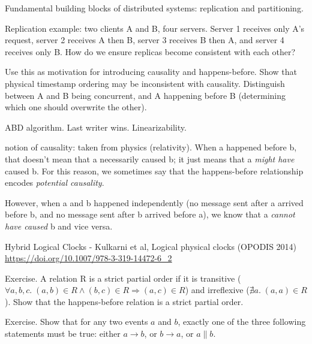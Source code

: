 Fundamental building blocks of distributed systems: replication and partitioning.

Replication example: two clients A and B, four servers. Server 1 receives only A's request,
server 2 receives A then B, server 3 receives B then A, and server 4 receives only B.
How do we ensure replicas become consistent with each other?

Use this as motivation for introducing causality and happens-before.
Show that physical timestamp ordering may  be inconsistent with causality.
Distinguish between A and B being concurrent, and A happening before B
(determining which one should overwrite the other).

ABD algorithm. Last writer wins. Linearizability.

notion of causality: taken from physics (relativity).
When a happened before b, that doesn't mean that a necessarily caused b; it just means that a \emph{might have} caused b.
For this reason, we sometimes say that the happens-before relationship encodes \emph{potential causality}.

However, when a and b happened independently (no message sent after a arrived before b, and no message sent after b arrived before a), we know that a \emph{cannot have caused} b and vice versa.

Hybrid Logical Clocks - Kulkarni et al, Logical physical clocks (OPODIS 2014) \url{https://doi.org/10.1007/978-3-319-14472-6_2}

Exercise. A relation R is a strict partial order if it is transitive ($\forall a,b,c.\; (a,b) \in R \wedge (b,c) \in R \Longrightarrow (a,c) \in R$) and irreflexive ($\nexists a.\; (a,a) \in R$). Show that the happens-before relation is a strict partial order.

Exercise. Show that for any two events $a$ and $b$, exactly one of the three following statements must be true: either $a \rightarrow b$, or $b \rightarrow a$, or $a \parallel b$.




{}

 {
    \begin{frame}
        
        {}
    \end{frame}
}

